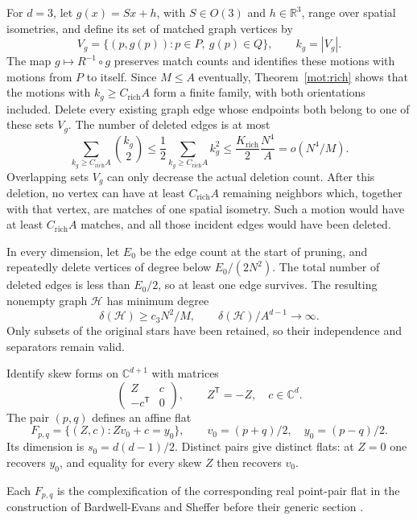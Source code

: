 For \(d=3\), let \(g(x)=Sx+h\), with \(S\in O(3)\) and
\(h\in\mathbb R^3\), range over spatial isometries, and define its set
of matched graph vertices by
\[
 V_g=\{(p,g(p)):p\in P,\ g(p)\in Q\},\qquad k_g=|V_g|.
\]
The map \(g\mapsto R^{-1}\circ g\) preserves match counts and identifies
these motions with motions from \(P\) to itself. Since \(M\le A\)
eventually, Theorem~\ref{mot:rich} shows that the motions with
\(k_g\ge C_{\mathrm{rich}}A\) form a finite family, with both
orientations included.
Delete every existing graph edge whose endpoints both belong to one
of these sets \(V_g\). The number of deleted edges is at most
\[
 \sum_{k_g\ge C_{\mathrm{rich}}A}\binom{k_g}{2}
 \le\frac12\sum_{k_g\ge C_{\mathrm{rich}}A}k_g^2
 \le\frac{K_{\mathrm{rich}}}{2}\frac{N^4}{A}
 =o(N^4/M).
\]
Overlapping sets \(V_g\) can only decrease the actual deletion count.
After this deletion, no vertex can have at least
\(C_{\mathrm{rich}}A\) remaining neighbors which, together with that
vertex, are matches of one spatial isometry. Such a motion would have
at least \(C_{\mathrm{rich}}A\) matches, and all those incident edges
would have been deleted.

In every dimension, let \(E_0\) be the edge count at the start of
pruning, and repeatedly delete vertices of degree below
\(E_0/(2N^2)\). The total number of deleted edges is less than
\(E_0/2\), so at least one edge survives.
The resulting nonempty graph \(\mathcal H\) has minimum degree
\begin{equation}\label{eq:minimum-degree}
 \delta(\mathcal H)\ge c_3N^2/M,\qquad
 \delta(\mathcal H)/A^{d-1}\longrightarrow\infty.
\end{equation}
Only subsets of the original stars have been retained, so their
independence and separators remain valid.

Identify skew forms on \(\mathbb C^{d+1}\) with matrices
\[
 \begin{pmatrix} Z&c\\-c^{\mathsf T}&0\end{pmatrix},
 \qquad Z^{\mathsf T}=-Z,\quad c\in\mathbb C^d.
\]
The pair \((p,q)\) defines an affine flat
\begin{equation}\label{eq:pair-flat}
 F_{p,q}=\{(Z,c):Zv_0+c=y_0\},\qquad
 v_0=(p+q)/2,\quad y_0=(p-q)/2 .
\end{equation}
Its dimension is \(s_0=d(d-1)/2\). Distinct pairs give distinct flats:
at \(Z=0\) one recovers \(y_0\), and equality for every skew \(Z\)
then recovers \(v_0\).

Each \(F_{p,q}\) is the complexification of the corresponding real
point-pair flat in the construction of Bardwell-Evans and Sheffer
before their generic section
\cite[Theorem~6.1]{BardwellEvansSheffer2019}.

